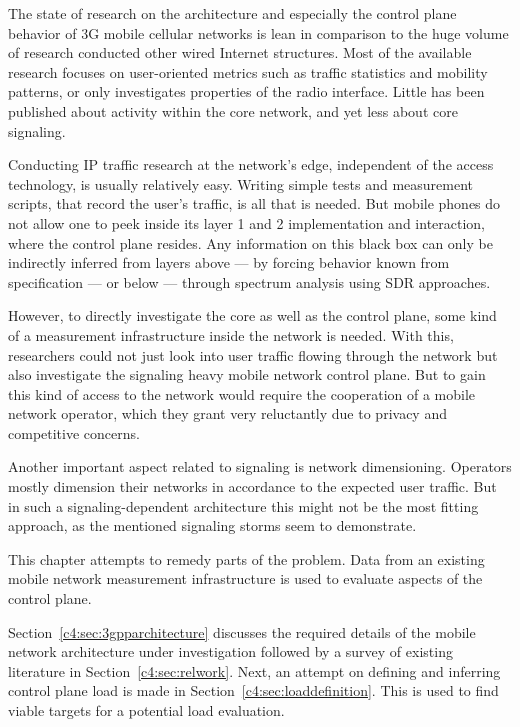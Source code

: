 The state of research on the architecture and especially the control plane behavior of \gls{3G} mobile cellular networks is lean in comparison to the huge volume of research conducted other wired Internet structures. Most of the available research focuses on user-oriented metrics such as traffic statistics and mobility patterns, or only investigates properties of the radio interface. Little has been published about activity within the core network, and yet less about core signaling. 

Conducting \gls{IP} traffic research at the network's edge, independent of the access technology, is usually relatively easy. Writing simple tests and measurement scripts, that record the user's traffic, is all that is needed. But mobile phones do not allow one to peek inside its layer 1 and 2 implementation and interaction, where the control plane resides. Any information on this black box can only be indirectly inferred from layers above --- by forcing behavior known from specification --- or below --- through spectrum analysis using \gls{SDR} approaches. 

However, to directly investigate the core as well as the control plane, some kind of a measurement infrastructure inside the network is needed. With this, researchers could not just look into user traffic flowing through the network but also investigate the signaling heavy mobile network control plane. But to gain this kind of access to the network  would require the cooperation of a mobile network operator, which they grant very reluctantly due to privacy and competitive concerns.

Another important aspect related to signaling is network dimensioning. Operators mostly dimension their networks in accordance to the expected user traffic. But in such a signaling-dependent architecture this might not be the most fitting approach, as the mentioned signaling storms seem to demonstrate. 

This chapter attempts to remedy parts of the problem. Data from an existing mobile network measurement infrastructure is used to evaluate aspects of the control plane. 

Section~\ref{c4:sec:3gpparchitecture} discusses the required details of the mobile network architecture under investigation followed by a survey of existing literature in Section~\ref{c4:sec:relwork}. Next, an attempt on defining and inferring control plane load is made in Section~\ref{c4:sec:loaddefinition}. This is used to find viable targets for a potential load evaluation. 

